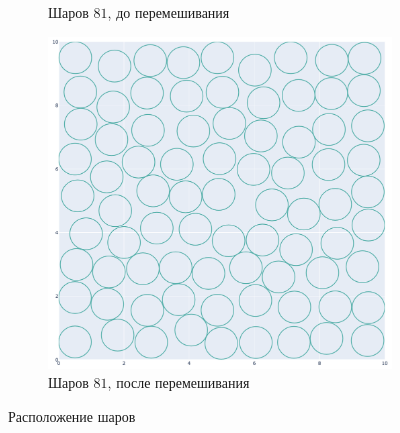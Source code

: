 \begin{enumerate}
\begin{figure}[h!]
\begin{subfigure}{0.49\textwidth}
            \caption{Шаров $81$, до перемешивания}
        \end{subfigure}
        \begin{subfigure}{0.49\textwidth}
            \centering
            \includegraphics [width=\imgsize,height=\imgsize]{figures/mesh_based/81_after_shuffeling.png}
            \caption{Шаров $81$, после перемешивания}
        \end{subfigure}
        \caption{Расположение шаров}
    \end{figure}
    \begin{figure}[h!]
        \centering

\end{figure}
\end{enumerate}
